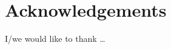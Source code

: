 \chapter*{Acknowledgements}
\par\noindent\begin{indpar}{0.1875in}{0in}%
%
I/we would like to thank \ldots
%
\end{indpar}
\clearpage
\fi					%
%
%
%
\rightfacing
{}
\noindent
%

\appendix


%
%
%
%

%
